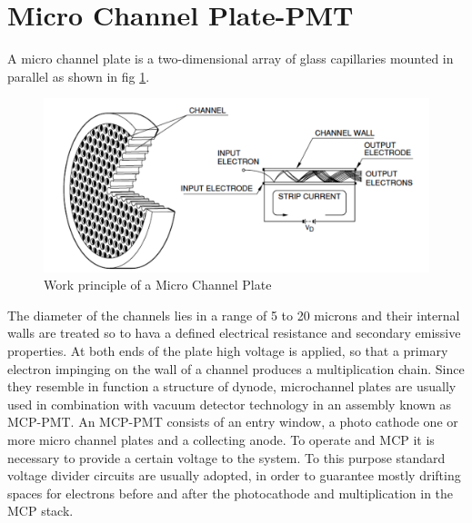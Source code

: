 \section{Micro Channel Plate-PMT}
A micro channel plate is a two-dimensional array of glass capillaries mounted in parallel as shown in fig \ref{fig:MCP_schematics}.
\begin{figure}[htbp]
\begin{center}
\includegraphics[width=12cm]{../Pictures/Chapter_3/MCP_plate.png}
\end{center}
\caption[MCP principle]{Work principle of a Micro Channel Plate}
\label{fig:MCP_schematics}
\end{figure}
The diameter of the channels lies in a range of 5 to 20 microns and their internal walls are treated so to hava a defined electrical resistance and secondary emissive properties.
At both ends of the plate high voltage is applied, so that a primary electron impinging on the wall of a channel produces a multiplication chain.
Since they resemble in function a structure of dynode, microchannel plates are usually used in combination with vacuum detector technology in an assembly known as MCP-PMT.
An MCP-PMT consists of an entry window, a photo cathode one or more micro channel plates and a collecting anode.
To operate and MCP it is necessary to provide a certain voltage to the system. To this purpose standard voltage divider circuits are usually adopted, in order to guarantee mostly drifting spaces for electrons before and after the photocathode and multiplication in the MCP stack\cite{Hama2006}.

  
